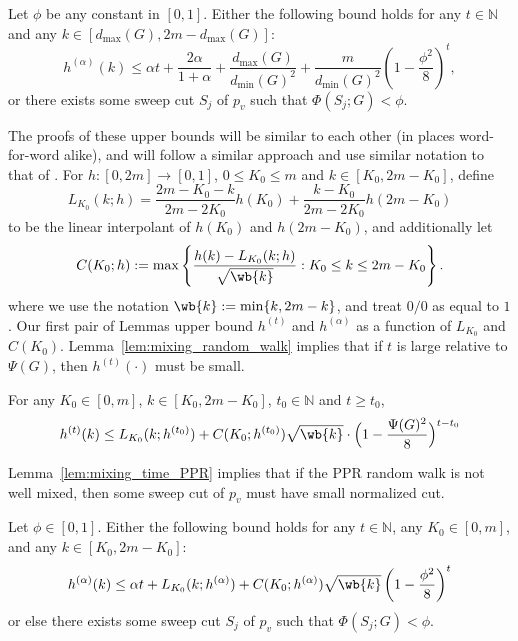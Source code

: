 \begin{theorem}
	\label{thm:mixing_time_PPR}
	Let $\phi$ be any constant in $[0,1]$. Either the following bound holds for any $t \in \mathbb{N}$ and any $k \in [d_{\max}(G),2m - d_{\max}(G)]$:
	\begin{equation*}
	h^{(\alpha)}(k) \leq \alpha t + \frac{2\alpha}{1 + \alpha} + \frac{d_{\max}(G)}{d_{\min}(G)^2} + \frac{m}{d_{\min}(G)^2} \left(1 - \frac{\phi^2}{8}\right)^{t},
	\end{equation*}
	or there exists some sweep cut $S_j$ of $p_v$ such that $\Phi(S_j;G) < \phi$.
\end{theorem}

The proofs of these upper bounds will be similar to each other (in places word-for-word alike), and will follow a similar approach and use similar notation to that of \citep{lovasz1990,andersen2006}. For $h: [0,2m] \to [0,1]$, $0 \leq K_0 \leq m$ and $k \in [K_0,2m - K_0]$, define
\begin{equation*}
L_{K_0}(k;h) = \frac{2m - K_0 - k}{2m - 2K_0}h(K_0) + \frac{k - K_0}{2m - 2K_0}h(2m - K_0)
\end{equation*}
to be the linear interpolant of $h(K_0)$ and $h(2m - K_0)$, and additionally let
\begin{equation*}
C(K_0;h) := \max\set{\frac{h(k) - L_{K_0}(k;h)}{\sqrt{\wb{k}}}: K_0 \leq k \leq  2m - K_0}.
\end{equation*}
where we use the notation $\wb{k} := \min\{k, 2m - k\}$, and treat $0/0$ as equal to $1$. Our first pair of Lemmas upper bound $h^{(t)}$ and $h^{(\alpha)}$ as a function of $L_{K_0}$ and $C(K_0)$. Lemma~\ref{lem:mixing_random_walk} implies that if $t$ is large relative to $\Psi(G)$, then $h^{(t)}(\cdot)$ must be small.

\begin{lemma}
	\label{lem:mixing_random_walk}
	For any $K_0 \in [0,m]$, $k \in [K_0, 2m - K_0]$, $t_0 \in \mathbb{N}$ and $t \geq t_0$,
	\begin{equation}
	\label{eqn:mixing_random_walk}
	h^{(t)}(k) \leq L_{K_0}(k;h^{(t_0)}) + C(K_0; h^{(t_0)}) \sqrt{\wb{k}} \cdot \Bigl(1 - \frac{\Psi(G)^2}{8}\Bigr)^{t - t_0}
	\end{equation}
\end{lemma}

Lemma~\ref{lem:mixing_time_PPR} implies that if the PPR random walk is not well mixed, then some sweep cut of $p_v$ must have small normalized cut.

\begin{lemma}
	\label{lem:mixing_time_PPR}
	Let $\phi \in [0,1]$. Either the following bound holds for any $t \in \mathbb{N}$, any $K_0 \in [0,m]$, and any $k \in [K_0,2m - K_0]$:
	\begin{equation}
	\label{eqn:mixing_time_PPR}
	h^{(\alpha)}(k) \leq \alpha t + L_{K_0}(k; h^{(\alpha)}) + C(K_0;h^{(\alpha)})\sqrt{\wb{k}}\left(1 - \frac{\phi^2}{8}\right)^t
	\end{equation}
	or else there exists some sweep cut $S_{j}$ of $p_v$ such that $\Phi(S_j;G) < \phi$.
\end{lemma}


